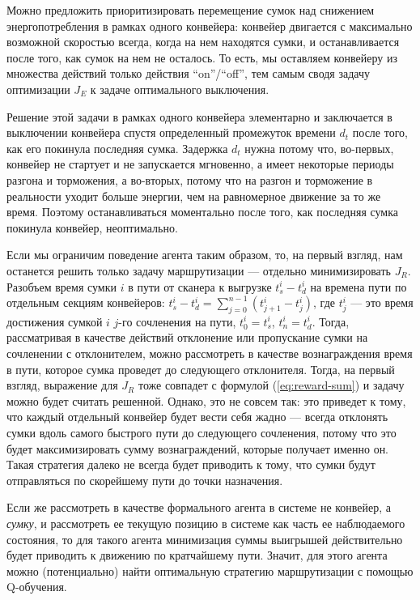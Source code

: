 \documentclass[specification,annotation,times]{itmo-student-thesis}
\theoremstyle{definition}
\begin{document}
Можно предложить приоритизировать перемещение сумок над снижением
энергопотребления в рамках одного конвейера: конвейер двигается с максимально
возможной скоростью всегда, когда на нем находятся сумки, и останавливается
после того, как сумок на нем не осталось. То есть, мы оставляем конвейеру из
множества действий только действия ``on''/``off'', тем самым сводя задачу
оптимизации $J_E$ к задаче оптимального выключения.

Решение этой задачи в рамках одного конвейера элементарно и заключается в
выключении конвейера спустя определенный промежуток времени $d_t$ после того,
как его покинула последняя сумка. Задержка $d_t$ нужна потому что, во-первых,
конвейер не стартует и не запускается мгновенно, а имеет некоторые периоды
разгона и торможения, а во-вторых, потому что на разгон и торможение в
реальности уходит больше энергии, чем на равномерное движение за то же время.
Поэтому останавливаться моментально после того, как последняя сумка покинула
конвейер, неоптимально.

Если мы ограничим поведение агента таким образом, то, на первый взгляд, нам
останется решить только задачу маршрутизации --- отдельно минимизировать $J_R$.
Разобъем время сумки $i$ в пути от сканера к выгрузке $t_s^i - t_d^i$ на времена
пути по отдельным секциям конвейеров:
$t_s^i - t_d^i = \sum\limits_{j=0}^{n-1} (t_{j+1}^i - t_j^i)$, где $t_j^i$ ---
это время достижения сумкой $i$ $j$-го сочленения на пути, $t_0^i = t_s^i$,
$t_n^i = t_d^i$. Тогда, рассматривая в качестве действий отклонение или
пропускание сумки на сочленении с отклонителем, можно рассмотреть в качестве
вознаграждения время в пути, которое сумка проведет до следующего отклонителя.
Тогда, на первый взгляд, выражение для $J_R$ тоже совпадет с формулой
(\ref{eq:reward-sum}) и задачу можно будет считать решенной. Однако, это не
совсем так: это приведет к тому, что каждый отдельный конвейер будет вести себя
жадно --- всегда отклонять сумки вдоль самого быстрого пути до следующего
сочленения, потому что это будет максимизировать сумму вознаграждений, которые
получает именно он. Такая стратегия далеко не всегда будет приводить к тому, что
сумки будут отправляться по скорейшему пути до точки назначения.

Если же рассмотреть в качестве формального агента в системе не
конвейер, а \textit{сумку}, и рассмотреть ее текущую позицию в системе как часть
ее наблюдаемого состояния, то для такого агента минимизация суммы выигрышей
действительно будет приводить к движению по кратчайшему пути. Значит, для этого
агента можно (потенциально) найти оптимальную стратегию маршрутизации с помощью
Q-обучения.
\end{document}
